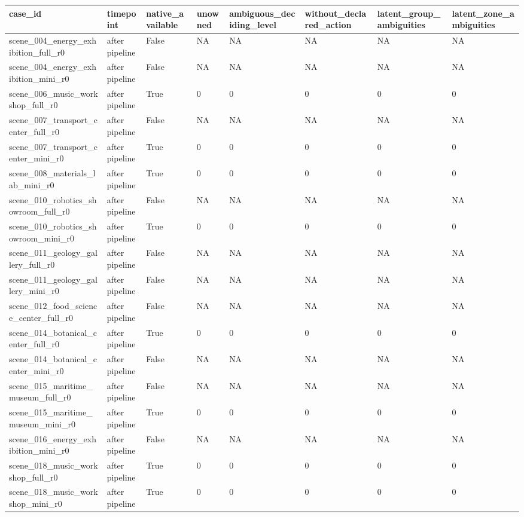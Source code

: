 \begin{tabular}{llllllll}
\toprule
case\_id & timepoint & native\_available & unowned & ambiguous\_deciding\_level & without\_declared\_action & latent\_group\_ambiguities & latent\_zone\_ambiguities \\
\midrule
scene\_004\_energy\_exhibition\_full\_r0 & after pipeline & False & NA & NA & NA & NA & NA \\
scene\_004\_energy\_exhibition\_mini\_r0 & after pipeline & False & NA & NA & NA & NA & NA \\
scene\_006\_music\_workshop\_full\_r0 & after pipeline & True & 0 & 0 & 0 & 0 & 0 \\
scene\_007\_transport\_center\_full\_r0 & after pipeline & False & NA & NA & NA & NA & NA \\
scene\_007\_transport\_center\_mini\_r0 & after pipeline & True & 0 & 0 & 0 & 0 & 0 \\
scene\_008\_materials\_lab\_mini\_r0 & after pipeline & True & 0 & 0 & 0 & 0 & 0 \\
scene\_010\_robotics\_showroom\_full\_r0 & after pipeline & False & NA & NA & NA & NA & NA \\
scene\_010\_robotics\_showroom\_mini\_r0 & after pipeline & True & 0 & 0 & 0 & 0 & 0 \\
scene\_011\_geology\_gallery\_full\_r0 & after pipeline & False & NA & NA & NA & NA & NA \\
scene\_011\_geology\_gallery\_mini\_r0 & after pipeline & False & NA & NA & NA & NA & NA \\
scene\_012\_food\_science\_center\_full\_r0 & after pipeline & False & NA & NA & NA & NA & NA \\
scene\_014\_botanical\_center\_full\_r0 & after pipeline & True & 0 & 0 & 0 & 0 & 0 \\
scene\_014\_botanical\_center\_mini\_r0 & after pipeline & False & NA & NA & NA & NA & NA \\
scene\_015\_maritime\_museum\_full\_r0 & after pipeline & False & NA & NA & NA & NA & NA \\
scene\_015\_maritime\_museum\_mini\_r0 & after pipeline & True & 0 & 0 & 0 & 0 & 0 \\
scene\_016\_energy\_exhibition\_mini\_r0 & after pipeline & False & NA & NA & NA & NA & NA \\
scene\_018\_music\_workshop\_full\_r0 & after pipeline & True & 0 & 0 & 0 & 0 & 0 \\
scene\_018\_music\_workshop\_mini\_r0 & after pipeline & True & 0 & 0 & 0 & 0 & 0 \\

\end{tabular}
